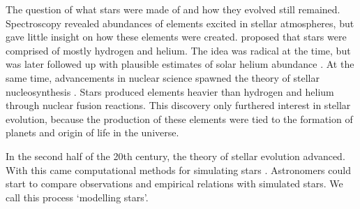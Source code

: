 



The question of what stars were made of and how they evolved still remained. Spectroscopy revealed abundances of elements excited in stellar atmospheres, but gave little insight on how these elements were created. \citet{Payne1925} proposed that stars were comprised of mostly hydrogen and helium. The idea was radical at the time, but was later followed up with plausible estimates of solar helium abundance \citep[e.g.][]{Schwarzschild1946}. At the same time, advancements in nuclear science spawned the theory of stellar nucleosynthesis \citep{Hoyle1946}. Stars produced elements heavier than hydrogen and helium through nuclear fusion reactions. This discovery only furthered interest in stellar evolution, because the production of these elements were tied to the formation of planets and origin of life in the universe.

In the second half of the 20th century, the theory of stellar evolution advanced. With this came computational methods for simulating stars \citep[e.g.][]{Kippenhahn.Weigert.ea1967}. Astronomers could start to compare observations and empirical relations with simulated stars. We call this process `modelling stars'. 

